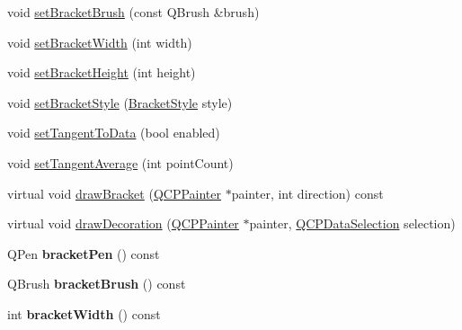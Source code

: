 \begin{DoxyCompactItemize}
void \hyperlink{class_q_c_p_selection_decorator_bracket_a2f4ea0bfb0ea980252b76dd349dd53aa}{set\+Bracket\+Brush} (const Q\+Brush \&brush)
\item 
void \hyperlink{class_q_c_p_selection_decorator_bracket_a291b59cab98ce93a0a3c85963fe10f5e}{set\+Bracket\+Width} (int width)
\item 
void \hyperlink{class_q_c_p_selection_decorator_bracket_aed773ad737201cca40efc6fe451acad8}{set\+Bracket\+Height} (int height)
\item 
void \hyperlink{class_q_c_p_selection_decorator_bracket_a04507697438f6ad8cc2aeea5422dcbe5}{set\+Bracket\+Style} (\hyperlink{class_q_c_p_selection_decorator_bracket_aa6d18517ec0553575bbef0de4252336e}{Bracket\+Style} style)
\item 
void \hyperlink{class_q_c_p_selection_decorator_bracket_a93bc6086e53a5e40a08641a7b2e2cdd5}{set\+Tangent\+To\+Data} (bool enabled)
\item 
void \hyperlink{class_q_c_p_selection_decorator_bracket_adb2d0876f25a77c88042b70818f1d6e4}{set\+Tangent\+Average} (int point\+Count)
\item 
virtual void \hyperlink{class_q_c_p_selection_decorator_bracket_a57b65b5508d5bd0f27c9318f3d4646be}{draw\+Bracket} (\hyperlink{class_q_c_p_painter}{Q\+C\+P\+Painter} $\ast$painter, int direction) const
\item 
virtual void \hyperlink{class_q_c_p_selection_decorator_bracket_a1ceb893063ea3d7197a24098018f4bfb}{draw\+Decoration} (\hyperlink{class_q_c_p_painter}{Q\+C\+P\+Painter} $\ast$painter, \hyperlink{class_q_c_p_data_selection}{Q\+C\+P\+Data\+Selection} selection)
\item 
\mbox{\label{class_q_c_p_selection_decorator_bracket_a841c56a37380f2e8af6126881b5f0fb9}} 
Q\+Pen {\bfseries bracket\+Pen} () const
\item 
\mbox{\label{class_q_c_p_selection_decorator_bracket_ac5e409d6b62f0b71143fb8a526fe59a9}} 
Q\+Brush {\bfseries bracket\+Brush} () const
\item 
\mbox{\label{class_q_c_p_selection_decorator_bracket_ae268c621b808d8660d38fc6c69fc40ae}} 
int {\bfseries bracket\+Width} () const
\item 
\mbox{\label{class_q_c_p_selection_decorator_bracket_a531d9c953a7279db93611248e115edab}} 

\end{DoxyCompactItemize}
